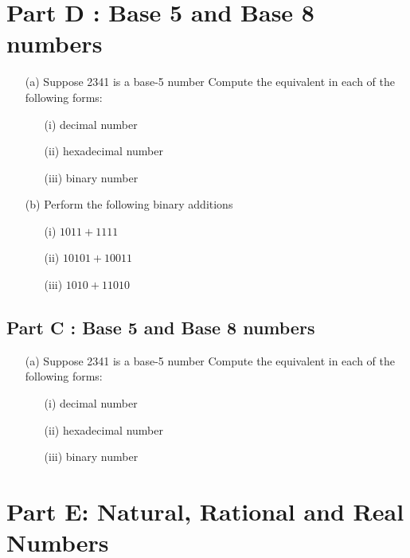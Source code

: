\documentclass[]{report}
\begin{document}
\section*{Part D : Base 5 and Base 8 numbers}
\begin{itemize}
\item[(a)] Suppose 2341 is a base-5 number
Compute the equivalent in each of the following forms:
\begin{itemize}
\item[(i)] decimal number
\item[(ii)] hexadecimal number
\item[(iii)] binary number
\end{itemize}
\item[(b)] Perform the following binary additions
\begin{itemize}
\item[(i)] $1011+ 1111$
\item[(ii)] $10101  + 10011$
\item[(iii)] $1010 + 11010$
\end{itemize}
\end{itemize}

\subsection*{Part C : Base 5 and Base 8 numbers}
\begin{itemize}
\item[(a)] Suppose 2341 is a base-5 number
Compute the equivalent in each of the following forms:
\begin{itemize}
\item[(i)] decimal number
\item[(ii)] hexadecimal number
\item[(iii)] binary number
\end{itemize}

\end{itemize}
\section*{Part E: Natural, Rational and Real Numbers}
\begin{framed}
\end{framed}
\end{document}
